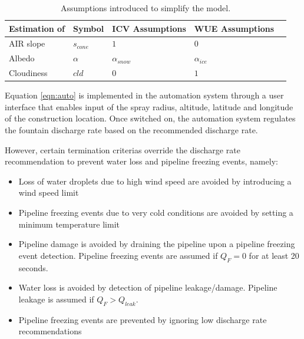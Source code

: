 \documentclass[tc, manuscript]{copernicus}
\begin{document}
\begin{table}[]
\centering
\caption{Assumptions introduced to simplify the model.}
\label{tab:assumptions}
\begin{tabular}{@{}lllll@{}}
\toprule
\textbf{Estimation of} & \textbf{Symbol} & \textbf{ICV Assumptions} & \textbf{WUE Assumptions} & \\ \midrule
\multicolumn{1}{|l}{AIR slope}        & $s_{cone}$ & $ 1 $ & $0$ & \multicolumn{1}{l|}{} \\ \midrule
\multicolumn{1}{|l}{Albedo} & $\alpha$ & $\alpha_{snow}$ & $\alpha_{ice}$ & \multicolumn{1}{l|}{} \\\midrule 
\multicolumn{1}{|l}{Cloudiness}  & $cld$ & $0$ & $1$ & \multicolumn{1}{l|}{} \\ \bottomrule
\end{tabular}
\end{table}

Equation \ref{eqn:auto} is implemented in the automation system through a user interface that enables input of
the spray radius, altitude, latitude and longitude of the construction location. Once switched on, the
automation system regulates the fountain discharge rate based on the recommended discharge rate. 

However, certain termination criterias override the discharge rate recommendation to prevent water loss and
pipeline freezing events, namely: 

\begin{itemize}

\item Loss of water droplets due to high wind speed are avoided by introducing a wind speed limit 

\item Pipeline freezing events due to very cold conditions are avoided by setting a minimum temperature limit 

\item Pipeline damage is avoided by draining the pipeline upon a pipeline freezing event detection. Pipeline freezing events are assumed if $Q_F = 0$ for at least 20 seconds.

\item Water loss is avoided by detection of pipeline leakage/damage. Pipeline leakage is assumed if $Q_F > Q_{leak}$. 

\item Pipeline freezing events are prevented by ignoring low discharge rate recommendations  

\end{itemize}
\end{document}
